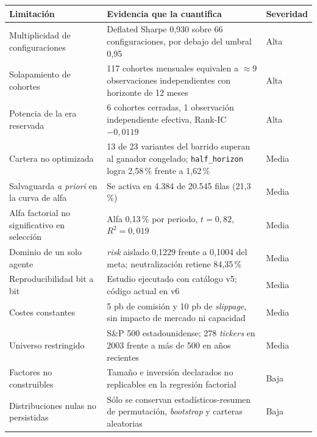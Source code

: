 \begin{tabularx}{\textwidth}{lXl}
\toprule
Limitación & Evidencia que la cuantifica & Severidad \\
\midrule
Multiplicidad de configuraciones &
Deflated Sharpe 0,930 sobre 66 configuraciones, por debajo del umbral 0,95 &
Alta \\
\addlinespace
Solapamiento de cohortes &
117 cohortes mensuales equivalen a $\approx 9$ observaciones independientes con horizonte de 12
meses &
Alta \\
\addlinespace
Potencia de la era reservada &
6 cohortes cerradas, 1 observación independiente efectiva, Rank-IC $-0{,}0119$ &
Alta \\
\addlinespace
Cartera no optimizada &
13 de 23 variantes del barrido superan al ganador congelado; \texttt{half\_horizon} logra 2,58\,\%
frente a 1,62\,\% &
Media \\
\addlinespace
Salvaguarda \textit{a priori} en la curva de alfa &
Se activa en 4.384 de 20.545 filas (21,3\,\%) &
Media \\
\addlinespace
Alfa factorial no significativo en selección &
Alfa 0,13\,\% por periodo, $t=0{,}82$, $R^2=0{,}019$ &
Media \\
\addlinespace
Dominio de un solo agente &
\textit{risk} aislado 0,1229 frente a 0,1004 del meta; neutralización retiene 84,35\,\% &
Media \\
\addlinespace
Reproducibilidad bit a bit &
Estudio ejecutado con catálogo v5; código actual en v6 &
Media \\
\addlinespace
Costes constantes &
5 pb de comisión y 10 pb de \textit{slippage}, sin impacto de mercado ni capacidad &
Media \\
\addlinespace
Universo restringido &
S\&P 500 estadounidense; 278 \textit{tickers} en 2003 frente a más de 500 en años recientes &
Media \\
\addlinespace
Factores no construibles &
Tamaño e inversión declarados no replicables en la regresión factorial &
Baja \\
\addlinespace
Distribuciones nulas no persistidas &
Sólo se conservan estadísticos-resumen de permutación, \textit{bootstrap} y carteras aleatorias &
Baja \\
\bottomrule
\end{tabularx}
